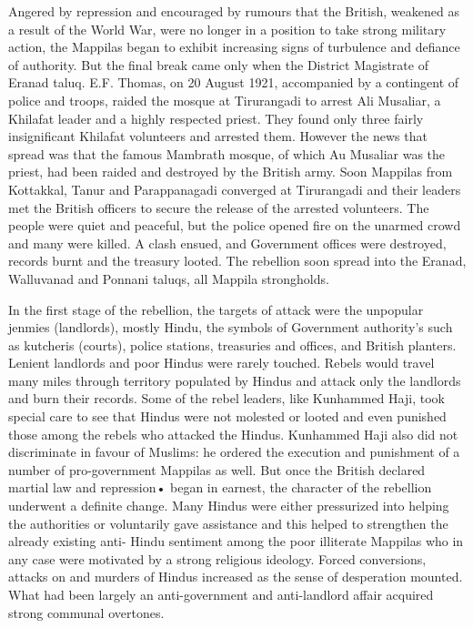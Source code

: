 Angered by repression and encouraged by rumours that the British, weakened as a result of the World War, were no longer in a position to take strong military action, the Mappilas began to exhibit increasing signs of turbulence and defiance of authority. But the final break came only when the District Magistrate of Eranad taluq. E.F. Thomas, on 20 August 1921, accompanied by a contingent of police and troops, raided the mosque at Tirurangadi to arrest Ali Musaliar, a Khilafat leader and a highly respected priest. They found only three fairly insignificant Khilafat volunteers and arrested them. However the news that spread was that the famous Mambrath mosque, of which Au Musaliar was the priest, had been raided and destroyed by the British army. Soon Mappilas from Kottakkal, Tanur and Parappanagadi converged at Tirurangadi and their leaders met the British officers to secure the release of the arrested volunteers. The people were quiet and peaceful, but the police opened fire on the unarmed crowd and many were killed. A clash ensued, and Government offices were destroyed, records burnt and the treasury looted. The rebellion soon spread into the Eranad, Walluvanad and Ponnani taluqs, all Mappila strongholds.

In the first stage of the rebellion, the targets of attack were the unpopular jenmies (landlords), mostly Hindu, the symbols of Government authority's such as kutcheris (courts), police stations, treasuries and offices, and British planters. Lenient landlords and poor Hindus were rarely touched. Rebels would travel many miles through territory populated by Hindus and attack only the landlords and burn their records. Some of the rebel leaders, like Kunhammed Haji, took special care to see that Hindus were not molested or looted and even punished those among the rebels who attacked the Hindus. Kunhammed Haji also did not discriminate in favour of Muslims: he ordered the execution and punishment of a number of pro-government Mappilas as well. But once the British declared martial law and repression• began in earnest, the character of the rebellion underwent a definite change. Many Hindus were either pressurized into helping the authorities or voluntarily gave assistance and this helped to strengthen the already existing anti- Hindu sentiment among the poor illiterate Mappilas who in any case were motivated by a strong religious ideology. Forced conversions, attacks on and murders of Hindus increased as the sense of desperation mounted. What had been largely an anti-government and anti-landlord affair acquired strong communal overtones.

